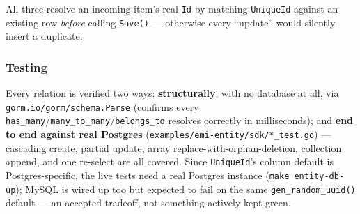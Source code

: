 All three resolve an incoming item's real \texttt{Id} by matching
\texttt{UniqueId} against an existing row \emph{before} calling
\texttt{Save()} --- otherwise every ``update'' would silently insert a
duplicate.

\subsubsection{Testing}
Every relation is verified two ways: \textbf{structurally}, with no
database at all, via \texttt{gorm.io/gorm/schema.Parse} (confirms every
\texttt{has\_many}/\texttt{many\_to\_many}/\texttt{belongs\_to} resolves
correctly in milliseconds); and \textbf{end to end against real
Postgres} (\texttt{examples/emi-entity/sdk/*\_test.go}) --- cascading
create, partial update, array replace-with-orphan-deletion, collection
append, and one re-select are all covered. Since \texttt{UniqueId}'s
column default is Postgres-specific, the live tests need a real Postgres
instance (\texttt{make entity-db-up}); MySQL is wired up too but expected
to fail on the same \texttt{gen\_random\_uuid()} default --- an accepted
tradeoff, not something actively kept green.
